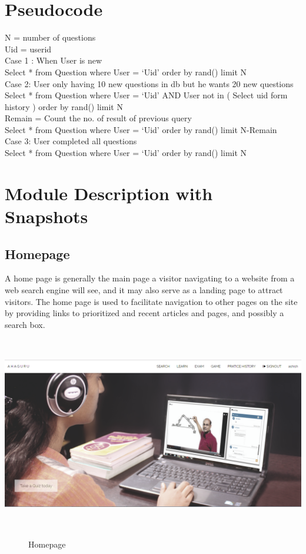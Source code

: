 \section{Pseudocode}
N  =  number of questions \\
Uid  = userid\\[0.5cm]
Case 1 : When User is new\\
Select  * from Question where User = ‘Uid’ order by rand() limit N\\[0.5cm]
Case 2: User only having 10 new questions in db but he wants 20 new questions\\
Select  * from Question where User = ‘Uid’ AND User not in ( Select uid form history ) order by rand() limit N \\
Remain = Count the no. of result of  previous query\\
Select  * from Question where User = ‘Uid’ order by rand() limit N-Remain\\[0.5cm]
Case 3: User completed all questions\\
Select  * from Question where User = ‘Uid’ order by rand() limit N

\section{Module Description with Snapshots}
\subsection{Homepage}
A home page is generally the main page a visitor navigating to a website from a web search engine will see, and it may also serve as a landing page to attract visitors. The home page is used to facilitate navigation to other pages on the site by providing links to prioritized and recent articles and pages, and possibly a search box.\\
\begin{center}
	\includegraphics[width=13.5cm, height=8.5cm]{home_page.png}
	\begin{figure}[h!]
		\centering
		\caption{Homepage}%
	\end{figure}
\end{center}

